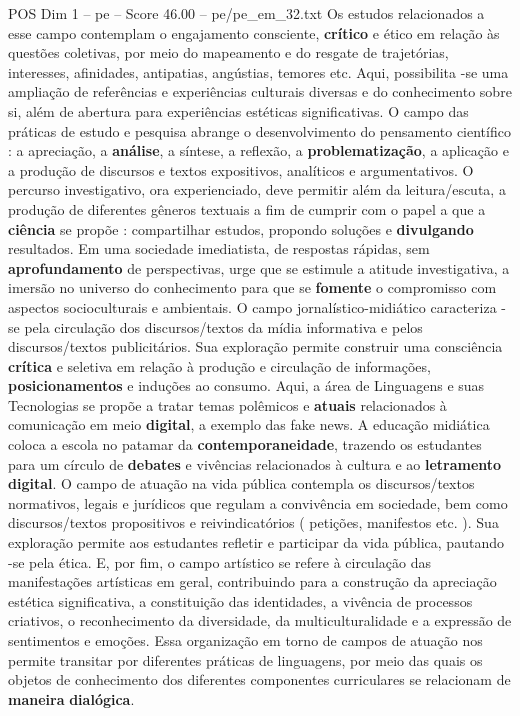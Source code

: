 \begin{textsample}{POS Dim 1 – pe – Score 46.00 – pe/pe\_em\_32.txt}
Os estudos relacionados a esse campo contemplam o engajamento consciente, \textbf{crítico} e ético em relação às questões coletivas, por meio do mapeamento e do resgate de trajetórias, interesses, afinidades, antipatias, angústias, temores etc.
Aqui, possibilita -se uma ampliação de referências e experiências culturais diversas e do conhecimento sobre si, além de abertura para experiências estéticas significativas.
O campo das práticas de estudo e pesquisa abrange o desenvolvimento do pensamento científico : a apreciação, a \textbf{análise}, a síntese, a reflexão, a \textbf{problematização}, a aplicação e a produção de discursos e textos expositivos, analíticos e argumentativos.
O percurso investigativo, ora experienciado, deve permitir além da leitura/escuta, a produção de diferentes gêneros textuais a fim de cumprir com o papel a que a \textbf{ciência} se propõe : compartilhar estudos, propondo soluções e \textbf{divulgando} resultados.
Em uma sociedade imediatista, de respostas rápidas, sem \textbf{aprofundamento} de perspectivas, urge que se estimule a atitude investigativa, a imersão no universo do conhecimento para que se \textbf{fomente} o compromisso com aspectos socioculturais e ambientais.
O campo jornalístico-midiático caracteriza -se pela circulação dos discursos/textos da mídia informativa e pelos discursos/textos publicitários.
Sua exploração permite construir uma consciência \textbf{crítica} e seletiva em relação à produção e circulação de informações, \textbf{posicionamentos} e induções ao consumo.
Aqui, a área de Linguagens e suas Tecnologias se propõe a tratar temas polêmicos e \textbf{atuais} relacionados à comunicação em meio \textbf{digital}, a exemplo das fake news.
A educação midiática coloca a escola no patamar da \textbf{contemporaneidade}, trazendo os estudantes para um círculo de \textbf{debates} e vivências relacionados à cultura e ao \textbf{letramento} \textbf{digital}.
O campo de atuação na vida pública contempla os discursos/textos normativos, legais e jurídicos que regulam a convivência em sociedade, bem como discursos/textos propositivos e reivindicatórios ( petições, manifestos etc. ).
Sua exploração permite aos estudantes refletir e participar da vida pública, pautando -se pela ética.
E, por fim, o campo artístico se refere à circulação das manifestações artísticas em geral, contribuindo para a construção da apreciação estética significativa, a constituição das identidades, a vivência de processos criativos, o reconhecimento da diversidade, da multiculturalidade e a expressão de sentimentos e emoções.
Essa organização em torno de campos de atuação nos permite transitar por diferentes práticas de linguagens, por meio das quais os objetos de conhecimento dos diferentes componentes curriculares se relacionam de \textbf{maneira} \textbf{dialógica}.

\end{textsample}

